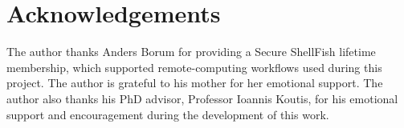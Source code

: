 \documentclass[pdflatex,sn-mathphys-num]{sn-jnl}
\theoremstyle{thmstyleone}%
\begin{document}

\maketitle










\section*{Acknowledgements}
The author thanks Anders Borum for providing a Secure ShellFish lifetime membership, which supported remote-computing workflows used during this project. The author is grateful to his mother for her emotional support. The author also thanks his PhD advisor, Professor Ioannis Koutis, for his emotional support and encouragement during the development of this work.




\end{document}
